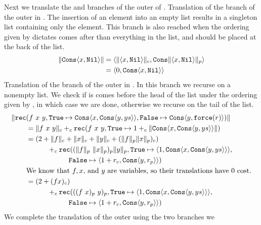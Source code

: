 %
%
%
Next we translate the  and  branches of the outer  of
. Translation of the  branch of the outer  in
. The insertion of an element into an empty list results in a
singleton list containing only the element.  This branch is also reached when
the ordering given by  dictates  comes after than everything in the
list, and should be placed at the back of the list.
%
\begin{align*}
  \|\texttt{Cons} \langle x, \texttt{Nil}\rangle\| &= \langle \|\langle x,\texttt{Nil}\rangle\|_c,\texttt{Cons}\|\langle x,\texttt{Nil}\rangle\|_p\rangle \\
                                         &= \langle 0,\texttt{Cons}\langle x,\texttt{Nil}\rangle\rangle
\end{align*}
%
%
%
Translation of the  branch of the outer  in .  In this
branch we recurse on a nonempty list.  We check if  is comes before the
head of the list under the ordering given by , in which case we are done,
otherwise we recurse on the tail of the list.
%
\begin{align*}
  \|\texttt{rec}&(f\ x\ y, \texttt{True}\mapsto \texttt{Cons}\langle x,\texttt{Cons}\langle y,ys \rangle\rangle, \texttt{False}\mapsto \texttt{Cons}\langle y,\texttt{force}(r)\rangle)\| \\
           &= \|f\ x\ y\|_c +_c \texttt{rec}(f\ x\ y, \texttt{True}\mapsto 1 +_c \|\texttt{Cons}\langle x,\texttt{Cons}\langle y,ys \rangle\rangle\|)  \\
           &= (2 + \|f\|_c + \|x\|_c + \|y\|_c + (\|f\|_p \|x\|_p)_c) \\
           &\qquad\quad +_c \texttt{rec}((\|f\|_p\ \|x\|_p)_p \|y\|_p, \texttt{True}\mapsto \langle 1, \texttt{Cons}\langle x,\texttt{Cons}\langle y,ys\rangle\rangle\rangle, \\
           &\qquad\quad\quad\quad\quad \texttt{False}\mapsto \langle 1 + r_c, \texttt{Cons}\langle y,r_p\rangle\rangle) \\
           &\text{We know that $f, x, $ and $y$ are variables, so their translations have $0$ cost.} \\
           &= (2 + (f x)_c) \\
           &\qquad\quad +_c \texttt{rec}(((f\ x)_p\ y)_p, \texttt{True}\mapsto \langle 1, \texttt{Cons}\langle x,\texttt{Cons}\langle y,ys\rangle\rangle\rangle, \\
           &\qquad\quad\quad\quad\quad \texttt{False}\mapsto \langle 1 + r_c, \texttt{Cons}\langle y,r_p\rangle\rangle)
\end{align*}
%
%
We complete the translation of the outer  using the two branches we
